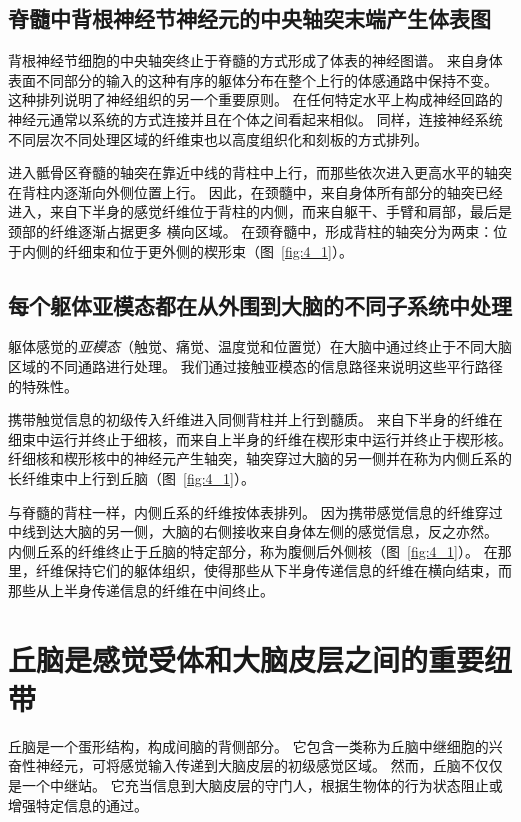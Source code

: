 \subsection{脊髓中背根神经节神经元的中央轴突末端产生体表图}

背根神经节细胞的中央轴突终止于脊髓的方式形成了体表的神经图谱。
来自身体表面不同部分的输入的这种有序的躯体分布在整个上行的体感通路中保持不变。
这种排列说明了神经组织的另一个重要原则。
在任何特定水平上构成神经回路的神经元通常以系统的方式连接并且在个体之间看起来相似。 
同样，连接神经系统不同层次不同处理区域的纤维束也以高度组织化和刻板的方式排列。


进入骶骨区脊髓的轴突在靠近中线的背柱中上行，而那些依次进入更高水平的轴突在背柱内逐渐向外侧位置上行。 
因此，在颈髓中，来自身体所有部分的轴突已经进入，来自下半身的感觉纤维位于背柱的内侧，而来自躯干、手臂和肩部，最后是颈部的纤维逐渐占据更多 横向区域。 
在颈脊髓中，形成背柱的轴突分为两束：位于内侧的纤细束和位于更外侧的楔形束（图~\ref{fig:4_1}）。



\subsection{每个躯体亚模态都在从外围到大脑的不同子系统中处理}

躯体感觉的\textit{亚模态}（触觉、痛觉、温度觉和位置觉）在大脑中通过终止于不同大脑区域的不同通路进行处理。
我们通过接触亚模态的信息路径来说明这些平行路径的特殊性。


携带触觉信息的初级传入纤维进入同侧背柱并上行到髓质。
来自下半身的纤维在细束中运行并终止于细核，而来自上半身的纤维在楔形束中运行并终止于楔形核。 
纤细核和楔形核中的神经元产生轴突，轴突穿过大脑的另一侧并在称为内侧丘系的长纤维束中上行到丘脑（图~\ref{fig:4_1}）。


与脊髓的背柱一样，内侧丘系的纤维按体表排列。
因为携带感觉信息的纤维穿过中线到达大脑的另一侧，大脑的右侧接收来自身体左侧的感觉信息，反之亦然。 
内侧丘系的纤维终止于丘脑的特定部分，称为腹侧后外侧核（图~\ref{fig:4_1}）。 
在那里，纤维保持它们的躯体组织，使得那些从下半身传递信息的纤维在横向结束，而那些从上半身传递信息的纤维在中间终止。



\section{丘脑是感觉受体和大脑皮层之间的重要纽带}

丘脑是一个蛋形结构，构成间脑的背侧部分。 
它包含一类称为丘脑中继细胞的兴奋性神经元，可将感觉输入传递到大脑皮层的初级感觉区域。 
然而，丘脑不仅仅是一个中继站。 
它充当信息到大脑皮层的守门人，根据生物体的行为状态阻止或增强特定信息的通过。


